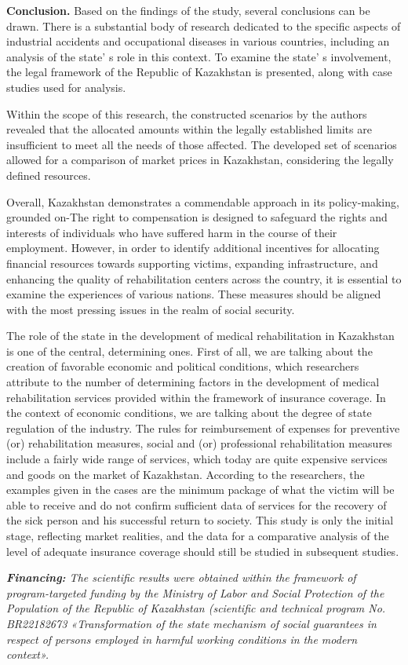 \begin{multicols}{2}


{\bfseries Conclusion.} Based on the findings of the study, several
conclusions can be drawn. There is a substantial body of research
dedicated to the specific aspects of industrial accidents and
occupational diseases in various countries, including an analysis of the
state' s role in this context. To examine the
state' s involvement, the legal framework of the Republic
of Kazakhstan is presented, along with case studies used for analysis.

Within the scope of this research, the constructed scenarios by the
authors revealed that the allocated amounts within the legally
established limits are insufficient to meet all the needs of those
affected. The developed set of scenarios allowed for a comparison of
market prices in Kazakhstan, considering the legally defined resources.

Overall, Kazakhstan demonstrates a commendable approach in its
policy-making, grounded on-The right to compensation is designed to
safeguard the rights and interests of individuals who have suffered harm
in the course of their employment. However, in order to identify
additional incentives for allocating financial resources towards
supporting victims, expanding infrastructure, and enhancing the quality
of rehabilitation centers across the country, it is essential to examine
the experiences of various nations. These measures should be aligned
with the most pressing issues in the realm of social security.

The role of the state in the development of medical rehabilitation in
Kazakhstan is one of the central, determining ones. First of all, we are
talking about the creation of favorable economic and political
conditions, which researchers attribute to the number of determining
factors in the development of medical rehabilitation services provided
within the framework of insurance coverage. In the context of economic
conditions, we are talking about the degree of state regulation of the
industry. The rules for reimbursement of expenses for preventive (or)
rehabilitation measures, social and (or) professional rehabilitation
measures include a fairly wide range of services, which today are quite
expensive services and goods on the market of Kazakhstan. According to
the researchers, the examples given in the cases are the minimum package
of what the victim will be able to receive and do not confirm sufficient
data of services for the recovery of the sick person and his successful
return to society. This study is only the initial stage, reflecting
market realities, and the data for a comparative analysis of the level
of adequate insurance coverage should still be studied in subsequent
studies.

\emph{{\bfseries Financing:} The scientific results were obtained within
the framework of program-targeted funding by the Ministry of Labor and
Social Protection of the Population of the Republic of Kazakhstan
(scientific and technical program No. BR22182673 «Transformation of the
state mechanism of social guarantees in respect of persons employed in
harmful working conditions in the modern context».}
\end{multicols}

